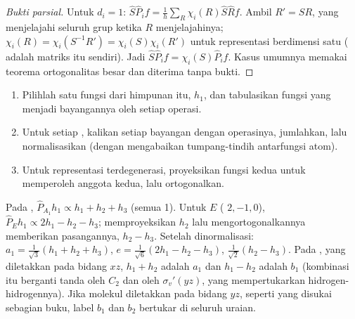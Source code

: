 \begin{proof}[Bukti parsial]
Untuk $d_i = 1$: $\hat S\hat P_if = \frac1h\sum_R\chi_i(R)\hat S\hat Rf$. Ambil $R' = SR$,
yang menjelajahi seluruh grup ketika $R$ menjelajahinya; $\chi_i(R) = \chi_i(S^{-1}R') =
\chi_i(S)\chi_i(R')$ untuk representasi berdimensi satu ( adalah
matriks itu sendiri). Jadi $\hat S\hat P_if = \chi_i(S)\hat P_if$. Kasus umumnya
memakai teorema ortogonalitas besar dan diterima tanpa bukti.
\end{proof}

\begin{method}\label{met:b3:group-theory-applied:salc}
\begin{enumerate}
  \item Pilihlah satu fungsi dari himpunan itu, $h_1$, dan tabulasikan fungsi
        yang menjadi bayangannya oleh setiap operasi.
  \item Untuk setiap , kalikan setiap bayangan
        dengan  operasinya, jumlahkan, lalu normalisasikan (dengan
        mengabaikan tumpang-tindih antarfungsi atom).
  \item Untuk representasi terdegenerasi, proyeksikan fungsi kedua untuk
        memperoleh anggota kedua, lalu ortogonalkan.
\end{enumerate}
\end{method}

\begin{example}\label{ex:b3:group-theory-applied:salcs}
Pada , $\hat P_{A_1}h_1 \propto h_1 + h_2 + h_3$ (semua  1). Untuk $E$
( $2, -1, 0$), $\hat P_Eh_1 \propto 2h_1 - h_2 - h_3$; memproyeksikan $h_2$
lalu mengortogonalkannya memberikan pasangannya, $h_2 - h_3$. Setelah
dinormalisasi: $a_1 =
\frac{1}{\sqrt3}(h_1 + h_2 + h_3)$, $e = \frac{1}{\sqrt6}(2h_1 - h_2 - h_3)$,
$\frac{1}{\sqrt2}(h_2 - h_3)$. Pada , yang diletakkan pada bidang $xz$,
$h_1 + h_2$ adalah $a_1$ dan $h_1 - h_2$ adalah $b_1$ (kombinasi itu berganti
tanda oleh $C_2$ dan oleh $\sigma_v'(yz)$, yang mempertukarkan
hidrogen-hidrogennya). Jika molekul diletakkan pada bidang $yz$, seperti yang
disukai sebagian buku, label $b_1$ dan $b_2$ bertukar di seluruh uraian.
\end{example}

